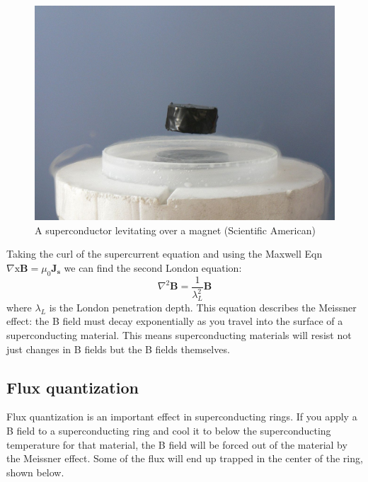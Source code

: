 \documentclass[conf]{new-aiaa}
\begin{document}
\begin{figure}
    \centering
    \includegraphics[scale = 0.3]{levitation.jpg}
    \caption{A superconductor levitating over a magnet (Scientific American)}
    \label{fig:my_label}
\end{figure}

Taking the curl of the supercurrent equation and using the Maxwell Eqn $\nabla \mathrm{x} \mathbf{B} = \mu_0 \mathbf{J_s}$ we can find the second London equation:
$$\nabla^2 \mathbf{B} = \frac{1}{\lambda_L^2} \mathbf{B}$$
where $\lambda_L$ is the London penetration depth. This equation describes the Meissner effect: the B field must decay exponentially as you travel into the surface of a superconducting material. This means superconducting materials will resist not just changes in B fields but the B fields themselves.\par 

\subsection{Flux quantization}

Flux quantization is an important effect in superconducting rings. If you apply a B field to a superconducting ring and cool it to below the superconducting temperature for that material, the B field will be forced out of the material by the Meissner effect. Some of the flux will end up trapped in the center of the ring, shown below. \par
\end{document}
